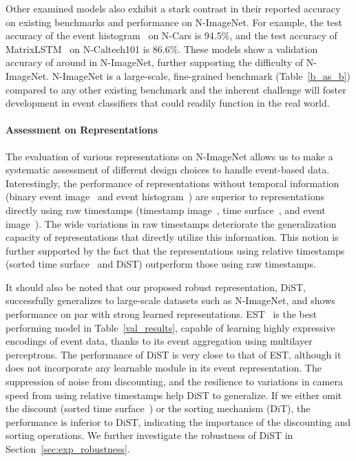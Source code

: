 Other examined models also exhibit a stark contrast in their reported accuracy on existing benchmarks and performance on N-ImageNet.
For example, the test accuracy of the event histogram~\cite{asynet} on N-Cars is 94.5\%, and the test accuracy of MatrixLSTM~\cite{matrix_lstm} on N-Caltech101 is 86.6\%.
These models show a validation accuracy of around  in N-ImageNet, further supporting the difficulty of N-ImageNet.
N-ImageNet is a large-scale, fine-grained benchmark (Table~\ref{b_as_b}) compared to any other existing benchmark and the inherent challenge will foster development in event classifiers that could readily function in the real world.

\paragraph{Assessment on Representations}
The evaluation of various representations on N-ImageNet allows us to make a systematic assessment of different design choices to handle event-based data.
Interestingly, the performance of representations without temporal information (binary event image~\cite{gesture_1,binary_image_2} and event histogram~\cite{event_driving}) are superior to representations directly using raw timestamps (timestamp image~\cite{timestamp_image}, time surface~\cite{hots}, and event image~\cite{ev_gait,evflownet}).
The wide variations in raw timestamps deteriorate the generalization capacity of representations that directly utilize this information.
This notion is further supported by the fact that the representations using relative timestamps (sorted time surface~\cite{ace} and DiST) outperform those using raw timestamps.

It should also be noted that our proposed robust representation, DiST, successfully generalizes to large-scale datasets such as N-ImageNet, and shows performance on par with strong learned representations.
EST~\cite{est} is the best performing model in Table~\ref{val_results}, capable of learning highly expressive encodings of event data, thanks to its event aggregation using multilayer perceptrons.
The performance of DiST is very close to that of EST, although it does not incorporate any learnable module in its event representation.
The suppression of noise from discounting, and the resilience to variations in camera speed from using relative timestamps help DiST to generalize.
If we either omit the discount (sorted time surface~\cite{ace}) or the sorting mechanism (DiT), the performance is inferior to DiST, indicating the importance of the discounting and sorting operations.
We further investigate the robustness of DiST in Section~\ref{sec:exp_robustness}.


